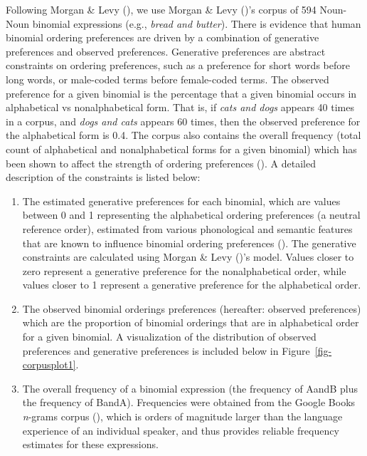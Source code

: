 \documentclass[
  12pt,
  letterpaper,
]{scrreprt}
\begin{document}
Following Morgan \& Levy
(), we use Morgan
\& Levy ()'s corpus of 594 Noun-Noun
binomial expressions (e.g., \emph{bread and butter}). There is evidence
that human binomial ordering preferences are driven by a combination of
generative preferences and observed preferences. Generative preferences
are abstract constraints on ordering preferences, such as a preference
for short words before long words, or male-coded terms before
female-coded terms. The observed preference for a given binomial is the
percentage that a given binomial occurs in alphabetical vs
nonalphabetical form. That is, if \emph{cats and dogs} appears 40 times
in a corpus, and \emph{dogs and cats} appears 60 times, then the
observed preference for the alphabetical form is 0.4. The corpus also
contains the overall frequency (total count of alphabetical and
nonalphabetical forms for a given binomial) which has been shown to
affect the strength of ordering preferences
(). A detailed description of the constraints is listed below:

\begin{enumerate}
\def\labelenumi{\arabic{enumi}.}
\item
  The estimated generative preferences for each binomial, which are
  values between 0 and 1 representing the alphabetical ordering
  preferences (a neutral reference order), estimated from various
  phonological and semantic features that are known to influence
  binomial ordering preferences (). The generative constraints are calculated using Morgan
  \& Levy ()'s model. Values closer to
  zero represent a generative preference for the nonalphabetical order,
  while values closer to 1 represent a generative preference for the
  alphabetical order.
\item
  The observed binomial orderings preferences (hereafter: observed
  preferences) which are the proportion of binomial orderings that are
  in alphabetical order for a given binomial. A visualization of the
  distribution of observed preferences and generative preferences is
  included below in Figure~\ref{fig-corpusplot1}.
\item
  The overall frequency of a binomial expression (the frequency of AandB
  plus the frequency of BandA). Frequencies were obtained from the
  Google Books \emph{n}-grams corpus
  (),
  which is orders of magnitude larger than the language experience of an
  individual speaker, and thus provides reliable frequency estimates for
  these expressions.
\end{enumerate}
\end{document}
